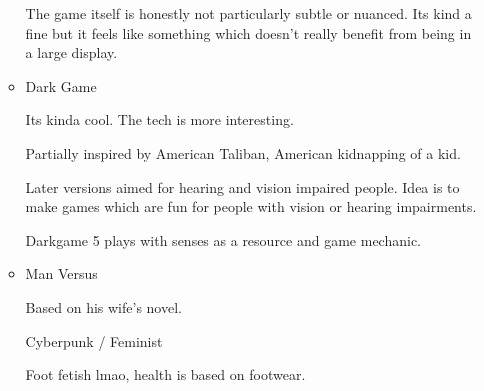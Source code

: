 \documentclass{report}
\begin{document}
\begin{itemize}
\begin{itemize}
\begin{mdframed}
                    The game itself is honestly not particularly subtle
                    or nuanced. Its kind a fine but it feels like something
                    which doesn't really benefit from being in a large
                    display.
                \end{mdframed}
            \item Dark Game
                \begin{mdframed}
                    Its kinda cool. The tech is more interesting.
                \end{mdframed}
                \begin{mdframed}
                    Partially inspired by American Taliban, American kidnapping
                    of a kid.
                \end{mdframed}
                \begin{mdframed}
                    Later versions aimed for hearing and vision impaired people.
                    Idea is to make games which are fun for people with vision or
                    hearing impairments.
                \end{mdframed}
                \begin{mdframed}
                    Darkgame 5 plays with senses as a resource and game mechanic.
                \end{mdframed}
            \item Man Versus
                \begin{mdframed}
                   Based on his wife's novel. 
                \end{mdframed}
                \begin{mdframed}
                    Cyberpunk / Feminist
                \end{mdframed}
                \begin{mdframed}
                    Foot fetish lmao, health is based
                    on footwear.
                \end{mdframed}
        \end{itemize}
\end{itemize}
\end{document}
